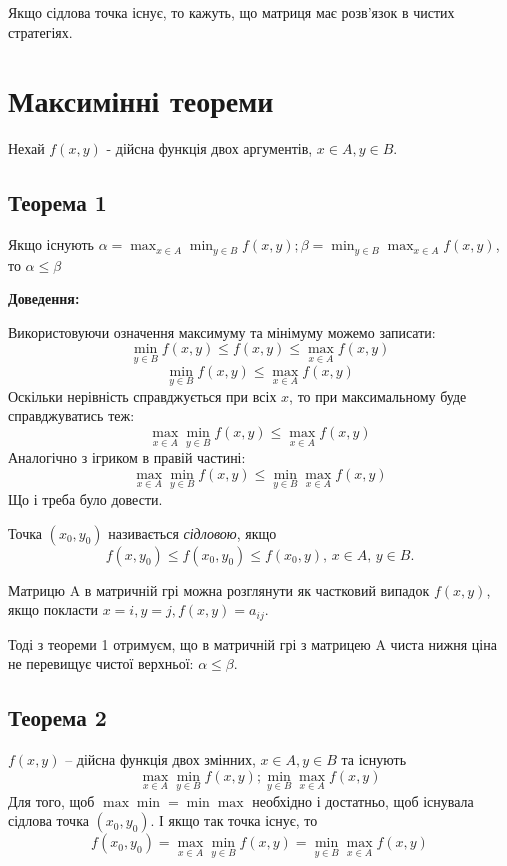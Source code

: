 \documentclass[12pt,a4paper]{book}
\begin{document}
Якщо сідлова точка існує, то кажуть, що матриця має розв'язок в чистих стратегіях.

\section{Максимінні теореми}

Нехай $f(x, y)$ - дійсна функція двох аргументів, $x \in A, y \in B$.

\subsection{Теорема 1}

Якщо існують $\displaystyle \alpha = \max_{x \in A} \min_{y \in B} f(x, y); \beta = \min_{y \in B} \max_{x \in A} f(x, y)$, то $\alpha \le \beta$

{\bf Доведення:}

Використовуючи означення максимуму та мінімуму можемо записати:
\[
\min_{y \in B}f(x, y) \le f(x, y) \le \max_{x \in A}f(x, y)
\]
\[
\min_{y \in B}f(x, y) \le \max_{x \in A}f(x, y)
\]
Оскільки нерівність справджується при всіх $x$, то при максимальному буде справджуватись теж:
\[
\max_{x \in A} \min_{y \in B}f(x, y) \le \max_{x \in A}f(x, y)
\]
Аналогічно з ігриком в правій частині:
\[
\max_{x \in A} \min_{y \in B}f(x, y) \le \min_{y \in B} \max_{x \in A}f(x, y)
\]
Що і треба було довести.

Точка $(x_0, y_0)$ називається \emph{сідловою}, якщо
\begin{equation}
f(x, y_0) \le f(x_0, y_0) \le f(x_0, y),\, x \in A,\, y \in B.
\end{equation}

Матрицю A в матричній грі можна розглянути як частковий випадок $f(x, y)$, якщо покласти $x=i, y=j, f(x, y) = a_{ij}$.

Тоді з теореми 1 отримуєм, що в матричній грі з матрицею A чиста нижня ціна не перевищує чистої верхньої: $\alpha \le \beta$.

\subsection{Теорема 2}

$f(x, y)$ -- дійсна функція двох змінних, $x \in A, y \in B$ та існують
\[
\max_{x \in A} \min_{y \in B}f(x, y); \min_{y \in B} \max_{x \in A}f(x, y)
\]
Для того, щоб $\max\min = \min\max$ необхідно і достатньо, щоб існувала сідлова точка $(x_0, y_0)$. І якщо так точка існує, то
\begin{equation}
f(x_0, y_0)=\max_{x \in A} \min_{y \in B}f(x, y) = \min_{y \in B} \max_{x \in A}f(x, y)
\end{equation}
\end{document}
